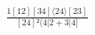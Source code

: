 \documentclass[varwidth, border=5pt]{standalone}
\begin{document}
\begin{my}
$\begin{gathered}
\scriptscriptstyle\frac{1[12][34]⟨24⟩[23]}{[24]²⟨4|2+3|4]}
\end{gathered}$
\end{my}
\end{document}
